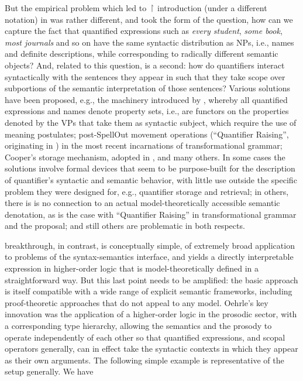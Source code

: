 \documentclass[output=paper,colorlinks,citecolor=brown]{langscibook}
\begin{document}
But the empirical problem which led to \ensuremath{\vs} introduction (under a different
notation) in \citet{oehrle1994} was rather different, and took the form of
the question, how can we capture the fact that quantified expressions
such as \textit{every student}, \textit{some book}, \textit{most journals} and so on have
the same syntactic distribution as NPs, i.e., names and definite
descriptions, while corresponding to radically different semantic
objects? And, related to this question, is a second: how do
quantifiers interact syntactically with the sentences they appear in
such that they take scope over subportions of the semantic
interpretation of those sentences? Various solutions have been
proposed, e.g., the machinery introduced by \citet{montague1973a}, whereby all quantified expressions and
names denote property sets, i.e., are functors on the properties
denoted by the VPs that take them as syntactic subject, which require
the use of meaning postulates; post-SpellOut
movement operations (``Quantifier Raising'', originating in
\citealt{may_r1985a}) in the most recent incarnations of transformational
grammar; Cooper's \citeyearpar{cooper75,Cooper83}
storage mechanism, adopted in \citet{pollardsag94}, and many others. In
some cases the solutions involve formal devices that seem to be
purpose-built for the description of quantifier's syntactic and
semantic behavior, with little use outside the specific problem they
were designed for, e.g., quantifier storage and retrieval; in others,
there is is no connection to an actual model-theoretically accessible
semantic denotation, as is the case with ``Quantifier Raising'' in
transformational grammar and the \citet{pollardsag94} proposal; and still
others are problematic in both respects.

 breakthrough, in contrast, is conceptually simple, of
extremely broad application to problems of the syntax-semantics
interface, and yields a directly interpretable expression in
higher-order logic that is model-theoretically defined in a
straightforward way. But this last point needs to be amplified: the
basic approach is itself compatible with a wide range of explicit
semantic frameworks, including proof-theoretic approaches that do not
appeal to any model. Oehrle's key innovation was the application of a
higher-order logic in the prosodic sector, with a corresponding type
hierarchy, allowing the semantics and the prosody to operate
independently of each other so that quantified expressions, and scopal
operators generally, can in effect take the syntactic contexts in
which they appear as their own arguments. The following simple example
is representative of the setup generally. We have
\end{document}
